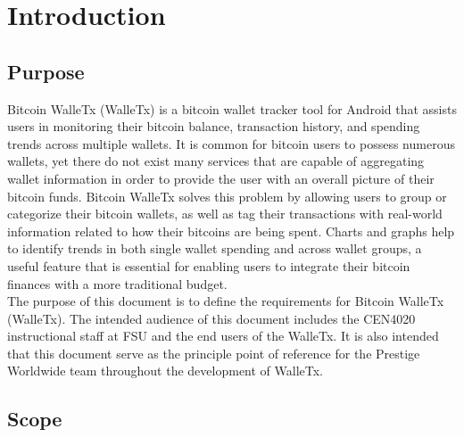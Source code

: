 \section{Introduction}

	\subsection{Purpose} 
	Bitcoin WalleTx (WalleTx) is a bitcoin wallet tracker tool for Android that assists users in monitoring their bitcoin balance, transaction history, and spending trends across multiple wallets. It is common for bitcoin users to possess numerous wallets, yet there do not exist many services that are capable of aggregating wallet information in order to provide the user with an overall picture of their bitcoin funds. Bitcoin WalleTx solves this problem by allowing users to group or categorize their bitcoin wallets, as well as tag their transactions with real-world information related to how their bitcoins are being spent. Charts and graphs help to identify trends in both single wallet spending and across wallet groups, a useful feature that is essential for enabling users to integrate their bitcoin finances with a more traditional budget.\\

	The purpose of this document is to define the requirements for Bitcoin WalleTx (WalleTx). The intended audience of this document includes the CEN4020 instructional staff at FSU and the end users of the WalleTx. It is also intended that this document serve as the principle point of reference for the Prestige Worldwide team throughout the development of WalleTx.\\

	\subsection{Scope}

